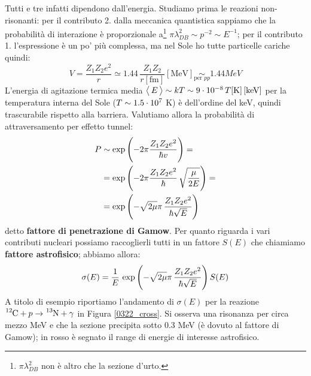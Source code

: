 Tutti e tre infatti dipendono dall'energia. Studiamo prima le reazioni non-risonanti: per il contributo 2. dalla meccanica quantistica sappiamo che la probabilità di interazione è proporzionale a\footnote{$\pi\lambda_{DB}^2$ non è altro che la sezione d'urto.} $\pi \lambda^2_{DB}\sim p^{-2} \sim E^{-1}$; per il contributo 1. l'espressione è un po' più complessa, ma nel Sole ho tutte particelle cariche quindi:
$$V = \frac{Z_1 Z_2 e^2}{r} \simeq 1.44 \, \frac{Z_1Z_2}{r[\mbox{fm}]} [\mbox{MeV}] \underset{\text{per }pp}{\sim} 1.44\unit{MeV}$$
L'energia di agitazione termica media $\bigl\langle\, E\, \bigr\rangle\sim kT \sim 9\cdot10^{-8} \, T[\mbox{K}]\,[\mbox{keV}]$ per la temperatura interna del Sole ($T\sim 1.5\cdot10^{7}$ K) è dell'ordine del keV, quindi trascurabile rispetto alla barriera. Valutiamo allora la probabilità di attraversamento per effetto tunnel:
\begin{displaymath}
\begin{aligned}
P &\sim \exp{\Biggl ( -2\pi \frac{Z_1Z_2 e^2}{\hbar v} \Biggr )} =\\
&= \exp{\Biggl ( -2\pi \frac{Z_1Z_2 e^2}{\hbar}\, \sqrt{\frac{\mu}{2E}} \Biggr )} =\\
&= \exp{\Biggl ( -\sqrt{2\mu}\pi\, \frac{Z_1Z_2 e^2}{\hbar \sqrt{E}} \Biggr )} 
\end{aligned}
\end{displaymath}
detto \textbf{fattore di penetrazione di Gamow}. Per quanto riguarda i vari contributi nucleari possiamo raccoglierli tutti in un fattore $S(E)$ che chiamiamo \textbf{fattore astrofisico}; abbiamo allora:
$$\sigma (E) = \frac{1}{E}\,\exp{\Biggl ( -\sqrt{2\mu}\pi\, \frac{Z_1Z_2 e^2}{\hbar \sqrt{E}} \Biggr )}\, S(E)$$
\noindent A titolo di esempio riportiamo l'andamento di $\sigma(E)$ per la reazione $\ce{^{12}C}+p\to \ce{^{13}N}+\gamma$ in Figura \ref{0322_cross}. Si osserva una risonanza per circa mezzo MeV e che la sezione precipita sotto 0.3 MeV (è dovuto al fattore di Gamow); in rosso è segnato il range di energie di interesse astrofisico.
